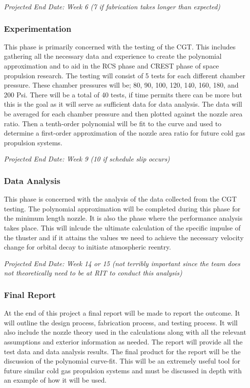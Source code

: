 \documentclass[conference]{IEEEtran} %
\begin{document}
    \textit{Projected End Date: Week 6 (7 if fabrication takes longer than expected)}

\subsubsection{Experimentation}
\label{subsubsec:experimentation}
    This phase is primarily concerned with the testing of the CGT\@. This includes gathering all the necessary data and experience to create the
    polynomial approximation and to aid in the RCS phase and CREST phase of space propulsion research.
    The testing will consist of 5 tests for each different chamber pressure. These chamber pressures will be; 80, 90, 100, 120, 140, 160, 180, and 200 Psi. There
    will be a total of 40 tests, if time permits there can be more but this is the goal as it will serve as sufficient data for data analysis.
     The data will be averaged for each chamber pressure and then plotted against the nozzle area ratio. Then a tenth-order polynomial
    will be fit to the curve and used to determine a first-order approximation of the nozzle area ratio for future cold gas propulsion systems.

    \textit{Projected End Date: Week 9 (10 if schedule slip occurs)}

\subsubsection{Data Analysis}
\label{subsubsec: data analysis}
    This phase is concerned with the analysis of the data collected from the CGT testing. The polynomial approximation will be completed during this
    phase for the minimum length nozzle. It is also the phase where the performance analysis takes place. This will inlcude the ultimate calculation of the specific impulse
    of the thuster and if it attains the values we need to achieve the necessary velocity change for orbital decay to initiate atmospheric reentry.

    \textit{Projected End Date: Week 14 or 15 (not terribly important since the team does not theoretically need to be at RIT to conduct this analysis)}

\subsubsection{Final Report}
\label{subsubsec: final report}
    At the end of this project a final report will be made to report the outcome. It will outline the design process, fabrication process, and testing process.
    It will also include the nozzle theory used in the calculations along with all the relevant assumptions and exterior information as needed. The report will provide
    all the test data and data analysis results. The final product for the report will be the discussion of the polynomial curve-fit. This will be an extremely useful tool
    for future similar cold gas propulsion systems and must be discussed in depth with an example of how it will be used.
\end{document}
